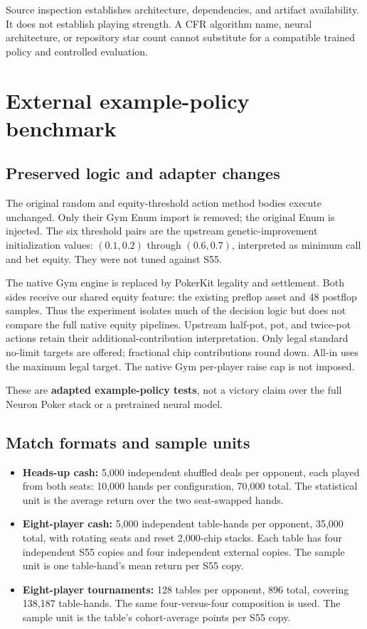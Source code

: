 \documentclass[11pt,letterpaper]{article}
\begin{document}
Source inspection establishes architecture, dependencies, and artifact
availability. It does not establish playing strength. A CFR algorithm name,
neural architecture, or repository star count cannot substitute for a
compatible trained policy and controlled evaluation.

\section{External example-policy benchmark}
\subsection{Preserved logic and adapter changes}
The original random and equity-threshold action method bodies execute
unchanged. Only their Gym Enum import is removed; the original Enum is
injected. The six threshold pairs are the upstream genetic-improvement
initialization values: $(0.1,0.2)$ through $(0.6,0.7)$, interpreted as minimum
call and bet equity. They were not tuned against S55.

The native Gym engine is replaced by PokerKit legality and settlement.
Both sides receive our shared equity feature: the existing preflop asset
and 48 postflop samples. Thus the experiment isolates much of the decision
logic but does not compare the full native equity pipelines. Upstream
half-pot, pot, and twice-pot actions retain their additional-contribution
interpretation. Only legal standard no-limit targets are offered;
fractional chip contributions round down. All-in uses the maximum legal
target. The native Gym per-player raise cap is not imposed.

These are \textbf{adapted example-policy tests}, not a victory claim over
the full Neuron Poker stack or a pretrained neural model.

\subsection{Match formats and sample units}
\begin{itemize}
\item \textbf{Heads-up cash:} 5,000 independent shuffled deals per opponent,
each played from both seats: 10,000 hands per configuration, 70,000 total.
The statistical unit is the average return over the two seat-swapped hands.
\item \textbf{Eight-player cash:} 5,000 independent table-hands per opponent,
35,000 total, with rotating seats and reset 2,000-chip stacks. Each table
has four independent S55 copies and four independent external copies.
The sample unit is one table-hand's mean return per S55 copy.
\item \textbf{Eight-player tournaments:} 128 tables per opponent, 896 total,
covering 138,187 table-hands. The same four-versus-four composition is used.
The sample unit is the table's cohort-average points per S55 copy.
\end{itemize}
\end{document}

